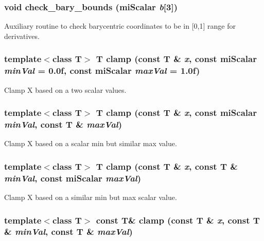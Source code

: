 \subsubsection{\setlength{\rightskip}{0pt plus 5cm}void check\_\-bary\_\-bounds (mi\-Scalar {\em b}[3])\hspace{0.3cm}{\tt  [inline]}}\label{namespacemr_a26}


Auxiliary routine to check barycentric coordinates to be in [0,1] range for derivatives. 
\subsubsection{\setlength{\rightskip}{0pt plus 5cm}template$<$class T$>$ T clamp (const T \& {\em x}, const mi\-Scalar {\em min\-Val} = 0.0f, const mi\-Scalar {\em max\-Val} = 1.0f)\hspace{0.3cm}{\tt  [inline]}}\label{namespacemr_a67}


Clamp X based on a two scalar values. 

\subsubsection{\setlength{\rightskip}{0pt plus 5cm}template$<$class T$>$ T clamp (const T \& {\em x}, const mi\-Scalar {\em min\-Val}, const T \& {\em max\-Val})\hspace{0.3cm}{\tt  [inline]}}\label{namespacemr_a66}


Clamp X based on a scalar min but similar max value. 

\subsubsection{\setlength{\rightskip}{0pt plus 5cm}template$<$class T$>$ T clamp (const T \& {\em x}, const T \& {\em min\-Val}, const mi\-Scalar {\em max\-Val})\hspace{0.3cm}{\tt  [inline]}}\label{namespacemr_a65}


Clamp X based on a similar min but max scalar value. 

\subsubsection{\setlength{\rightskip}{0pt plus 5cm}template$<$class T$>$ const T\& clamp (const T \& {\em x}, const T \& {\em min\-Val}, const T \& {\em max\-Val})\hspace{0.3cm}{\tt  [inline]}}\label{namespacemr_a64}


